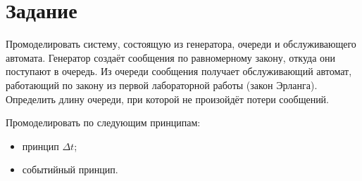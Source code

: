 \chapter*{Задание}

Промоделировать систему, состоящую из генератора, очереди и обслуживающего автомата. Генератор создаёт сообщения по равномерному закону, откуда они поступают в очередь. Из очереди сообщения получает обслуживающий автомат, работающий по закону из первой лабораторной работы (закон Эрланга). Определить длину очереди, при которой не произойдёт потери сообщений.

Промоделировать по следующим принципам:
\begin{itemize}
	\item принцип $\Delta t$;
	\item событийный принцип.
\end{itemize}